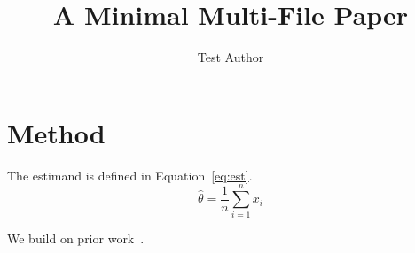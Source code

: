 \documentclass{article}
\title{A Minimal Multi-File Paper}
\author{Test Author}
\begin{document}
\maketitle



\section{Method}
The estimand is defined in Equation~\ref{eq:est}.
\begin{equation}\label{eq:est}
  \hat{\theta} = \frac{1}{n}\sum_{i=1}^{n} x_i
\end{equation}

We build on prior work~\cite{smith2024}.



\end{document}
